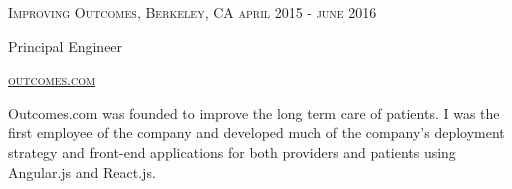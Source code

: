 {
  \textsc{\small{Improving Outcomes, Berkeley, CA
    \hfill
      {\raggedleft
        april 2015 - june 2016
      } \\
    }
  }
  {\raggedright\large {
      Principal Engineer
  }}

  \textsc{\small\href{http://www.outcomes.com}{outcomes.com}}

  \normalsize{\raggedright
    Outcomes.com was founded to improve the long term care of patients. I was the first employee of the company and developed much of the company's deployment strategy and front-end applications for both providers and patients using Angular.js and React.js. 
  }
}
